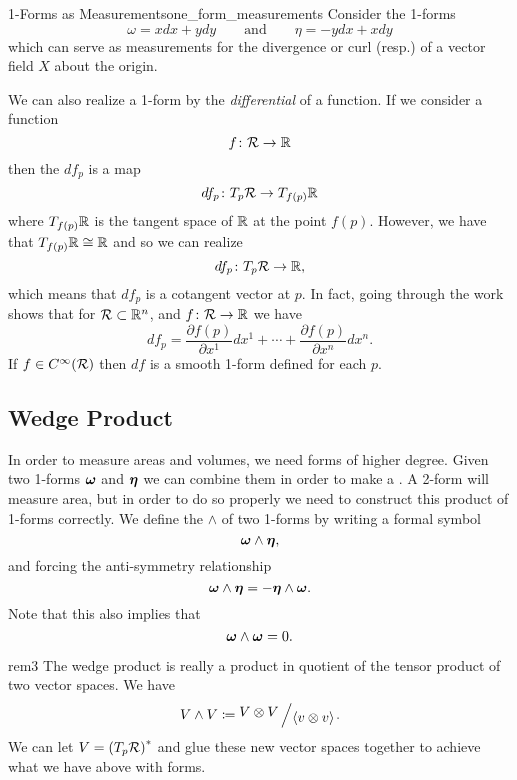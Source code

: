         \begin{ex}{1-Forms as Measurements}{one_form_measurements}
        Consider the 1-forms 
        \[
        \omega = xdx + y dy \qquad \textrm{and} \qquad \eta = -ydx + xdy
        \]
        which can serve as measurements for the divergence or curl (resp.) of a vector field $X$ about the origin.  
        \end{ex}
        
        We can also realize a 1-form by the \emph{differential} of a function.  If we consider a function
        \[
        f\colon \mathcal{R} \to \mathbb{R}
        \]
        then the  $df_p$ is a map
        \[
        df_p \colon T_p\mathcal{R} \to T_{f(p)}\mathbb{R}
        \]
        where $T_{f(p)}\mathbb{R}$ is the tangent space of $\mathbb{R}$ at the point $f(p)$. However, we have that $T_{f(p)}\mathbb{R}\cong \mathbb{R}$ and so we can realize 
        \[
        df_{p} \colon T_p\mathcal{R} \to \mathbb{R},
        \]
        which means that $df_p$ is a cotangent vector at $p$.  In fact, going through the work shows that for $\mathcal{R} \subset \mathbb{R}^n$, and $f\colon \mathcal{R} \to \mathbb{R}$ we have
        \[
        df_p = \frac{\partial f(p)}{\partial x^1}dx^1 + \cdots + \frac{\partial f(p)}{\partial x^n}dx^n.
        \]
        If $f \in C^\infty(\mathcal{R})$ then $df$ is a smooth 1-form defined for each $p$.

\subsection{Wedge Product}

In order to measure areas and volumes, we need forms of higher degree. Given two 1-forms $\boldsymbol{\omega}$ and $\boldsymbol{\eta}$ we can combine them in order to make a .  A 2-form will measure area, but in order to do so properly we need to construct this product of 1-forms correctly.  We define the  $\wedge$ of two 1-forms by writing a formal symbol
\[
\boldsymbol{\omega} \wedge \boldsymbol{\eta},
\]
and forcing the anti-symmetry relationship
\[
\boldsymbol{\omega} \wedge \boldsymbol{\eta} = - \boldsymbol{\eta} \wedge \boldsymbol{\omega}.
\]
Note that this also implies that
\[
\boldsymbol{\omega} \wedge \boldsymbol{\omega} = 0.
\]

\begin{remark}{}{rem3}
The wedge product is really a product in quotient of the tensor product of two vector spaces.  We have
\[
V \wedge V \coloneqq \bigslant{V\otimes V}{\langle v\otimes v \rangle}.
\]
We can let $V=\left(T_p\mathcal{R}\right)^*$ and glue these new vector spaces together to achieve what we have above with forms.
\end{remark}

